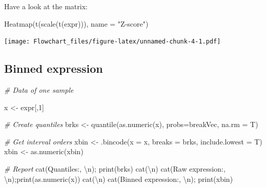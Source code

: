 \documentclass[
]{book}
\newenvironment{Shaded}{\begin{snugshade}}{\end{snugshade}}
\newcommand{\AttributeTok}[1]{\textcolor[rgb]{0.77,0.63,0.00}{#1}}
\newcommand{\CommentTok}[1]{\textcolor[rgb]{0.56,0.35,0.01}{\textit{#1}}}
\newcommand{\DecValTok}[1]{\textcolor[rgb]{0.00,0.00,0.81}{#1}}
\newcommand{\FunctionTok}[1]{\textcolor[rgb]{0.00,0.00,0.00}{#1}}
\newcommand{\NormalTok}[1]{#1}
\newcommand{\OtherTok}[1]{\textcolor[rgb]{0.56,0.35,0.01}{#1}}
\newcommand{\SpecialCharTok}[1]{\textcolor[rgb]{0.00,0.00,0.00}{#1}}
\newcommand{\StringTok}[1]{\textcolor[rgb]{0.31,0.60,0.02}{#1}}
\begin{document}
Have a look at the matrix:

\begin{Shaded}
\begin{Highlighting}[]
\FunctionTok{Heatmap}\NormalTok{(}\FunctionTok{t}\NormalTok{(}\FunctionTok{scale}\NormalTok{(}\FunctionTok{t}\NormalTok{(expr))), }\AttributeTok{name =} \StringTok{"Z{-}score"}\NormalTok{)}
\end{Highlighting}
\end{Shaded}

\texttt{[image: Flowchart\_files/figure-latex/unnamed-chunk-4-1.pdf]}

\hypertarget{binned-expression}{%
\subsection{Binned expression}\label{binned-expression}}

\begin{Shaded}
\begin{Highlighting}[]
\CommentTok{\# Data of one sample}

\NormalTok{x }\OtherTok{\textless{}{-}}\NormalTok{ expr[,}\DecValTok{1}\NormalTok{]}

\CommentTok{\# Create quantiles  }
\NormalTok{brks }\OtherTok{\textless{}{-}} \FunctionTok{quantile}\NormalTok{(}\FunctionTok{as.numeric}\NormalTok{(x), }
                 \AttributeTok{probs=}\NormalTok{breakVec, }
                 \AttributeTok{na.rm =}\NormalTok{ T)}

\CommentTok{\# Get interval orders}
\NormalTok{xbin }\OtherTok{\textless{}{-}} \FunctionTok{.bincode}\NormalTok{(}\AttributeTok{x =}\NormalTok{ x, }
                 \AttributeTok{breaks =}\NormalTok{ brks, }
                 \AttributeTok{include.lowest =}\NormalTok{ T)}
\NormalTok{xbin }\OtherTok{\textless{}{-}} \FunctionTok{as.numeric}\NormalTok{(xbin)}

\CommentTok{\# Report}
\FunctionTok{cat}\NormalTok{(}\StringTok{\textquotesingle{}Quantiles:\textquotesingle{}}\NormalTok{, }\StringTok{\textquotesingle{}}\SpecialCharTok{\textbackslash{}n}\StringTok{\textquotesingle{}}\NormalTok{); }\FunctionTok{print}\NormalTok{(brks)}
\FunctionTok{cat}\NormalTok{(}\StringTok{\textquotesingle{}}\SpecialCharTok{\textbackslash{}n}\StringTok{\textquotesingle{}}\NormalTok{)}
\FunctionTok{cat}\NormalTok{(}\StringTok{\textquotesingle{}Raw expression:\textquotesingle{}}\NormalTok{, }\StringTok{\textquotesingle{}}\SpecialCharTok{\textbackslash{}n}\StringTok{\textquotesingle{}}\NormalTok{);}\FunctionTok{print}\NormalTok{(}\FunctionTok{as.numeric}\NormalTok{(x))}
\FunctionTok{cat}\NormalTok{(}\StringTok{\textquotesingle{}}\SpecialCharTok{\textbackslash{}n}\StringTok{\textquotesingle{}}\NormalTok{)}
\FunctionTok{cat}\NormalTok{(}\StringTok{\textquotesingle{}Binned expression:\textquotesingle{}}\NormalTok{, }\StringTok{\textquotesingle{}}\SpecialCharTok{\textbackslash{}n}\StringTok{\textquotesingle{}}\NormalTok{); }\FunctionTok{print}\NormalTok{(xbin)}
\end{Highlighting}
\end{Shaded}
\end{document}
